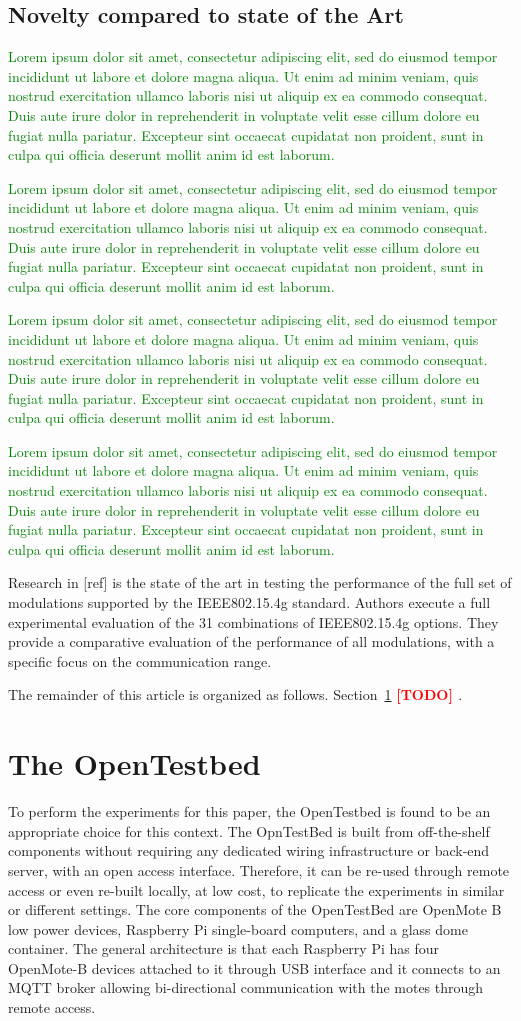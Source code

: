 \documentclass[journal]{IEEEtran}
\newcommand{\todo}[1]      {\textbf{\textcolor{red}{[TODO] #1}}}
\newcommand{\lorem}        {\textcolor{green}{Lorem ipsum dolor sit amet, consectetur adipiscing elit, sed do eiusmod tempor incididunt ut labore et dolore magna aliqua. Ut enim ad minim veniam, quis nostrud exercitation ullamco laboris nisi ut aliquip ex ea commodo consequat. Duis aute irure dolor in reprehenderit in voluptate velit esse cillum dolore eu fugiat nulla pariatur. Excepteur sint occaecat cupidatat non proident, sunt in culpa qui officia deserunt mollit anim id est laborum.}}
\begin{document}
\subsection{Novelty compared to state of the Art}



\lorem 

\lorem

\lorem

\lorem


Research in [ref] is the state of the art in testing the performance of the full set of modulations supported by the IEEE802.15.4g standard.
    Authors execute a full experimental evaluation of the 31 combinations of IEEE802.15.4g options.
    They provide a comparative evaluation of the performance of all modulations, with a specific focus on the communication range. 



The remainder of this article is organized as follows.
Section~\ref{sec:opentested} \todo{}.

\section{The OpenTestbed}
\label{sec:opentested}

To perform the experiments for this paper, the OpenTestbed \cite{munoz19opentestbed} is found to be an appropriate choice for this context.
The OpnTestBed is built from off-the-shelf components without requiring any dedicated wiring infrastructure or back-end server, with an open access interface. 
Therefore, it can be re-used through remote access or even re-built locally, at low cost, to replicate the experiments in similar or different settings.  
The core components of the OpenTestBed are OpenMote B low power devices, Raspberry Pi single-board computers, and a glass dome container.
The general architecture is that each Raspberry Pi has four OpenMote-B devices attached to it through USB interface and it connects to an MQTT broker allowing bi-directional communication with the motes through remote access. 
\end{document}
